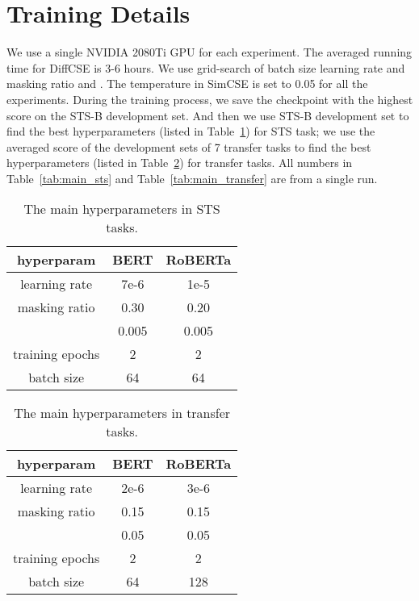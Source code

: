 \documentclass[11pt]{article}
\newcommand{\ba}{\xspace}
\begin{document}
\section{Training Details}
\label{sec:appendix}
We use a single NVIDIA 2080Ti GPU for each experiment. The averaged running time for DiffCSE is 3-6 hours. We use grid-search of batch size  learning rate  and masking ratio  and . The temperature  in SimCSE is set to 0.05 for all the experiments.
During the training process, we save the checkpoint with the highest score on the STS-B development set. And then we use STS-B development set to find the best hyperparameters (listed in Table~\ref{tab:hyper_sts}) for STS task; we use the averaged score of the development sets of 7 transfer tasks to find the best hyperparameters (listed in Table~\ref{tab:hyper_trans}) for transfer tasks. All numbers in Table~\ref{tab:main_sts} and Table~\ref{tab:main_transfer} are from a single run.
\begin{table}[h!]
\centering
\small
\setlength\tabcolsep{3pt}
\begin{tabular}{ccc}
\toprule
\bf hyperparam & \bf BERT\ba & \bf RoBERTa\ba\\
\midrule
learning rate & 7e-6 & 1e-5\\
masking ratio & 0.30 & 0.20 \\
 & 0.005 & 0.005 \\
training epochs & 2 & 2 \\
batch size & 64 & 64 \\
\bottomrule
\end{tabular}
\caption{The main hyperparameters in STS tasks.}
\label{tab:hyper_sts}
\end{table}

\begin{table}[h!]
\centering
\small
\setlength\tabcolsep{3pt}
\begin{tabular}{ccc}
\toprule
\bf hyperparam & \bf BERT\ba & \bf RoBERTa\ba\\
\midrule
learning rate & 2e-6 & 3e-6\\
masking ratio & 0.15 & 0.15 \\
 & 0.05 & 0.05 \\
training epochs & 2 & 2 \\
batch size & 64 & 128 \\
\bottomrule
\end{tabular}
\caption{The main hyperparameters in transfer tasks.}
\label{tab:hyper_trans}
\end{table}
\end{document}
